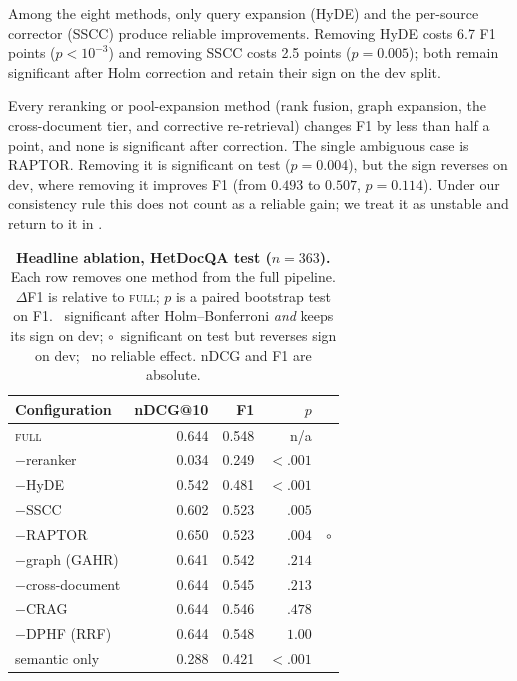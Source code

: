 \documentclass[10pt,twocolumn]{article}
\newcommand{\yes}{\textcolor{posg}{\ding{51}}}
\newcommand{\no}{\textcolor{nullg}{\ding{55}}}
\newcommand{\unstable}{\textcolor{accent}{$\circ$}}
\begin{document}
Among the eight methods, only query expansion (HyDE) and the per-source
corrector (SSCC) produce reliable improvements. Removing HyDE costs 6.7 F1 points
($p{<}10^{-3}$) and removing SSCC costs 2.5 points ($p{=}0.005$); both remain
significant after Holm correction and retain their sign on the dev split.

Every reranking or pool-expansion method (rank fusion, graph expansion, the
cross-document tier, and corrective re-retrieval) changes F1 by less than half a
point, and none is significant after correction. The single ambiguous case is RAPTOR.
Removing it is significant on test ($p{=}0.004$), but the sign reverses on dev,
where removing it improves F1 (from $0.493$ to $0.507$, $p{=}0.114$). Under our
consistency rule this does not count as a reliable gain; we treat it as unstable
and return to it in .

\begin{table}[t]
\centering
\small
\caption{\textbf{Headline ablation, HetDocQA test ($n{=}363$).} Each row removes
one method from the full pipeline. $\Delta$F1 is relative to \textsc{full};
$p$ is a paired bootstrap test on F1. \yes\ significant after Holm--Bonferroni
\emph{and} keeps its sign on dev; \unstable\ significant on test but
reverses sign on dev; \no\ no reliable effect. nDCG and F1 are absolute.}
\label{tab:headline}
\begin{tabular}{@{}lrrrr@{}}
\toprule
\textbf{Configuration} & \textbf{nDCG@10} & \textbf{F1} & \textbf{$p$} & \\
\midrule
\textsc{full}            & 0.644 & 0.548 & n/a & \\
\midrule
$-$reranker              & 0.034 & 0.249 & $<.001$ & \yes\\
$-$HyDE                  & 0.542 & 0.481 & $<.001$ & \yes\\
$-$SSCC                  & 0.602 & 0.523 & $.005$  & \yes\\
$-$RAPTOR                & 0.650 & 0.523 & $.004$  & \unstable\\
$-$graph (GAHR)          & 0.641 & 0.542 & $.214$  & \no\\
$-$cross-document        & 0.644 & 0.545 & $.213$  & \no\\
$-$CRAG                  & 0.644 & 0.546 & $.478$  & \no\\
$-$DPHF (RRF)            & 0.644 & 0.548 & $1.00$  & \no\\
\midrule
semantic only            & 0.288 & 0.421 & $<.001$ & \\
\bottomrule
\end{tabular}
\end{table}
\end{document}
